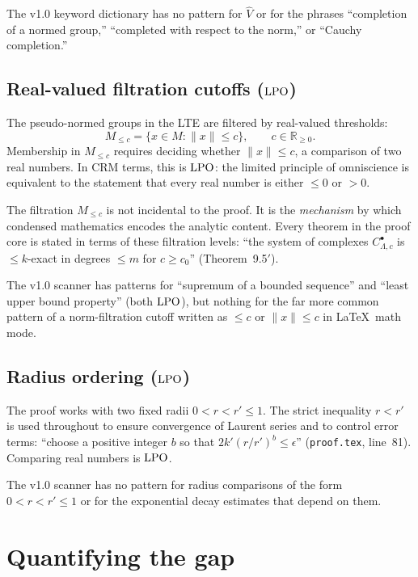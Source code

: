 \documentclass[11pt,a4paper]{article}
\theoremstyle{plain}
\theoremstyle{definition}
\newcommand{\LPO}{\textup{LPO}}
\newcommand{\R}{\mathbb{R}}
\begin{document}
The v1.0 keyword dictionary has no pattern for $\widehat{V}$ or for
the phrases ``completion of a normed group,'' ``completed with respect
to the norm,'' or ``Cauchy completion.''

\subsection{Real-valued filtration cutoffs ($\LPO$)}

The pseudo-normed groups in the LTE are filtered by real-valued
thresholds:
\[
  M_{\leq c} = \{x \in M : \|x\| \leq c\}, \qquad c \in \R_{\geq 0}.
\]
Membership in $M_{\leq c}$ requires deciding whether $\|x\| \leq c$,
a comparison of two real numbers.  In CRM terms, this is $\LPO$: the
limited principle of omniscience is equivalent to the statement that
every real number is either $\leq 0$ or $> 0$.

The filtration $M_{\leq c}$ is not incidental to the proof.  It is
the \emph{mechanism} by which condensed mathematics encodes the
analytic content.  Every theorem in the proof core is stated in terms
of these filtration levels: ``the system of complexes
$C^\bullet_{\Lambda,c}$ is $\leq k$-exact in degrees $\leq m$
for $c \geq c_0$'' (Theorem~9.5$'$).

The v1.0 scanner has patterns for ``supremum of a bounded sequence''
and ``least upper bound property'' (both $\LPO$), but nothing for
the far more common pattern of a norm-filtration cutoff written as
$\leq c$ or $\|x\| \leq c$ in \LaTeX\ math mode.

\subsection{Radius ordering ($\LPO$)}

The proof works with two fixed radii $0 < r < r' \leq 1$.  The
strict inequality $r < r'$ is used throughout to ensure convergence
of Laurent series and to control error terms: ``choose a positive
integer $b$ so that $2k'(r/r')^b \leq \epsilon$'' (\texttt{proof.tex},
line~81).  Comparing real numbers is $\LPO$.

The v1.0 scanner has no pattern for radius comparisons of the form
$0 < r < r' \leq 1$ or for the exponential decay estimates that
depend on them.

\section{Quantifying the gap}\label{sec:gap}
\end{document}
